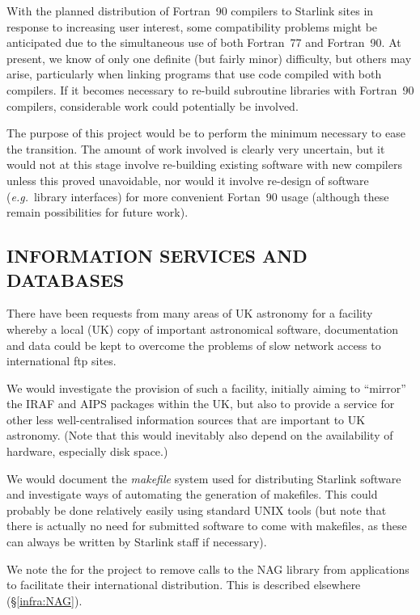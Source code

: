 {With the planned distribution of Fortran~90 compilers to Starlink
sites in response to increasing user interest, some compatibility
problems might be anticipated due to the simultaneous use of both
Fortran~77 and Fortran~90.  At present, we know of only one definite
(but fairly minor) difficulty, but others may arise, particularly when
linking programs that use code compiled with both compilers. If it
becomes necessary to re-build subroutine libraries with Fortran~90
compilers, considerable work could potentially be involved.

The purpose of this project would be to perform the minimum necessary
to ease the transition. The amount of work involved is clearly very
uncertain, but it would not at this stage involve re-building existing
software with new compilers unless this proved unavoidable, nor would
it involve re-design of software ({\em e.g.}\ library interfaces) for
more convenient Fortan~90 usage (although these remain possibilities
for future work).}

\subsection{\label{info}INFORMATION SERVICES AND DATABASES}

{There have been requests from many areas of UK astronomy for a
facility whereby a local (UK) copy of important astronomical software,
documentation and data could be kept to overcome the problems of slow
network access to international ftp sites.

We would investigate the provision of such a facility, initially
aiming to ``mirror'' the IRAF and AIPS packages within the UK, but
also to provide a service for other less well-centralised information
sources that are important to UK astronomy. (Note that this would
inevitably also depend on the availability of hardware, especially
disk space.)}

{We would document the {\em makefile} system used for distributing
Starlink software and investigate ways of automating the generation of
makefiles. This could probably be done relatively easily using
standard UNIX tools (but note that there is actually no need for
submitted software to come with makefiles, as these can always be
written by Starlink staff if necessary).}

{We note the  for the project to remove calls to the NAG
library from applications to facilitate their international
distribution. This is described elsewhere (\S\ref{infra:NAG}).}

